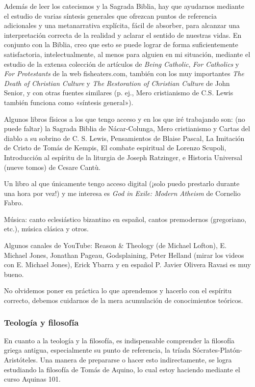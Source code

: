 \documentclass[12pt]{article}
\begin{document}
Además de leer los catecismos y la Sagrada Biblia, hay que ayudarnos mediante el
estudio de varias síntesis generales que ofrezcan puntos de referencia
adicionales y una metanarrativa explícita, fácil de absorber, para alcanzar una
interpretación correcta de la realidad y aclarar el sentido de nuestras vidas.
En conjunto con la Biblia, creo que esto se puede lograr de forma
suficientemente satisfactoria, intelectualmente, al menos para alguien en mi
situación, mediante el estudio de la extensa colección de artículos de
\textit{Being Catholic}, \textit{For Catholics} y \textit{For Protestants} de la
web fisheaters.com, también con los muy importantes
\textit{The Death of Christian Culture} y
\textit{The Restoration of Christian Culture} de John Senior, y con otras
fuentes similares (p. ej., Mero cristianismo de C.S. Lewis también funciona como
«síntesis general»).

Algunos libros físicos a los que tengo acceso y en los que iré trabajando son:
(no puede faltar) la Sagrada Biblia de Nácar-Colunga, Mero cristianismo y Cartas
del diablo a su sobrino de C. S. Lewis, Pensamientos de Blaise Pascal, La
Imitación de Cristo de Tomás de Kempis, El combate espiritual de Lorenzo
Scupoli, Introducción al espíritu de la liturgia de Joseph Ratzinger, e Historia
Universal (nueve tomos) de Cesare Cantù.

Un libro al que únicamente tengo acceso digital (¡solo puedo prestarlo
durante una hora por vez!) y me interesa es \textit{God in Exile: Modern
Atheism} de Cornelio Fabro.

Música: canto eclesiástico bizantino en español, cantos premodernos (gregoriano,
etc.), música clásica y otros.

Algunos canales de YouTube: Reason \& Theology (de Michael Lofton), E. Michael
Jones, Jonathan Pageau, Godsplaining, Peter Helland (mirar los videos con E.
Michael Jones), Erick Ybarra y en español P. Javier Olivera Ravasi es muy bueno.

No olvidemos poner en práctica lo que aprendemos y hacerlo con el espíritu
correcto, debemos cuidarnos de la mera acumulación de conocimientos teóricos.

\subsubsection*{Teología y filosofía}

En cuanto a la teología y la filosofía, es indispensable comprender la filosofía
griega antigua, especialmente su punto de referencia, la tríada
Sócrates-Platón-Aristóteles. Una manera de prepararse o hacer esto
indirectamente, se logra estudiando la filosofía de Tomás de Aquino, lo cual
estoy haciendo mediante el curso Aquinas 101.
\end{document}
